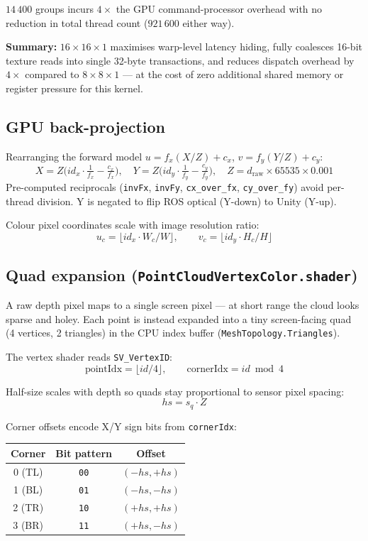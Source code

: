 \documentclass[11pt,a4paper]{article}
\begin{document}
$14\,400$ groups incurs $4\times$ the GPU command-processor overhead with no
reduction in total thread count ($921\,600$ either way).

\medskip\noindent
\textbf{Summary:} $16\times16\times1$ maximises warp-level latency hiding,
fully coalesces 16-bit texture reads into single 32-byte transactions, and
reduces dispatch overhead by $4\times$ compared to $8\times8\times1$ — at the cost
of zero additional shared memory or register pressure for this kernel.

\subsection{GPU back-projection}

Rearranging the forward model $u = f_x(X/Z)+c_x$,\; $v = f_y(Y/Z)+c_y$:
\[
X = Z\bigl(id_x \cdot \tfrac{1}{f_x} - \tfrac{c_x}{f_x}\bigr), \quad
Y = Z\bigl(id_y \cdot \tfrac{1}{f_y} - \tfrac{c_y}{f_y}\bigr), \quad
Z = d_\text{raw}\times 65535 \times 0.001
\]
Pre-computed reciprocals (\texttt{invFx}, \texttt{invFy}, \texttt{cx\_over\_fx},
\texttt{cy\_over\_fy}) avoid per-thread division. Y is negated to flip ROS optical
(Y-down) to Unity (Y-up).

Colour pixel coordinates scale with image resolution ratio:
\[
u_c = \lfloor id_x \cdot W_c/W \rfloor, \qquad v_c = \lfloor id_y \cdot H_c/H \rfloor
\]

\subsection{Quad expansion (\texttt{PointCloudVertexColor.shader})}

A raw depth pixel maps to a single screen pixel — at short range the cloud looks
sparse and holey. Each point is instead expanded into a tiny screen-facing quad
(4 vertices, 2 triangles) in the CPU index buffer (\texttt{MeshTopology.Triangles}).

The vertex shader reads \texttt{SV\_VertexID}:
\[
\text{pointIdx} = \lfloor id/4 \rfloor, \qquad \text{cornerIdx} = id \bmod 4
\]

Half-size scales with depth so quads stay proportional to sensor pixel spacing:
\[
hs = s_q \cdot Z
\]

Corner offsets encode X/Y sign bits from \texttt{cornerIdx}:

\begin{center}
\begin{tabular}{ccc}
\toprule
\textbf{Corner} & \textbf{Bit pattern} & \textbf{Offset} \\
\midrule
0 (TL) & \texttt{00} & $(-hs,+hs)$ \\
1 (BL) & \texttt{01} & $(-hs,-hs)$ \\
2 (TR) & \texttt{10} & $(+hs,+hs)$ \\
3 (BR) & \texttt{11} & $(+hs,-hs)$ \\
\bottomrule
\end{tabular}
\end{center}
\end{document}
